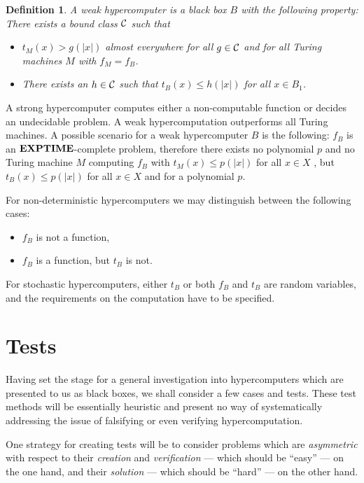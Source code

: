 \documentclass[12pt]{article}
\newtheorem{definition}{{\bf Definition} }
\begin{document}
\begin{definition}
A {\em weak hypercomputer} is a black box $B$ with the
following property:
%
There exists a bound class ${\cal C}$ such that
\begin{itemize}
\item $t_M(x) > g(|x|)$ almost everywhere for all $g \in {\cal C}$ and for
    all Turing machines $M$ with $f_M =f_B$.
\item There exists an $h \in {\cal C}$ such that $t_B(x) \leq h(|x|)$ for
        all $x \in B_1$.
\end{itemize}
\end{definition}

A strong hypercomputer computes either a
non-computable function or decides an undecidable problem. A weak
hypercomputation outperforms all Turing machines. A possible
scenario for a weak hypercomputer $B$ is the following:
%
$f_B$ is an ${\bf EXPTIME}$-complete problem, therefore there exists no
polynomial $p$ and no Turing machine $M$ computing $f_B$ with
$t_M(x) \leq p(|x|)$ for all $x \in X$ , but $t_B(x) \leq p(|x|)$
for all $x \in X$ and for a polynomial $p$.

For non-deterministic hypercomputers we may distinguish between the following cases:
\begin{itemize}
\item $f_B$ is not a function,
\item $f_B$ is a function, but $t_B$ is not.
\end{itemize}

For stochastic hypercomputers, either $t_B$ or both $f_B$ and
$t_B$ are random variables, and the requirements on the computation have to be
specified.




\section{Tests}

Having set the stage for a general investigation into hypercomputers which are presented to us as
black boxes, we shall consider a few cases and tests.
These test methods will be essentially heuristic and present no way of systematically addressing
the issue of falsifying or even verifying hypercomputation.

One strategy for creating tests will be to consider problems which are {\em asymmetric} with respect to their
{\em creation} and {\em verification} --- which should be ``easy'' --- on the one hand,
and their {\em solution} --- which should be ``hard'' --- on the other hand.
\end{document}
